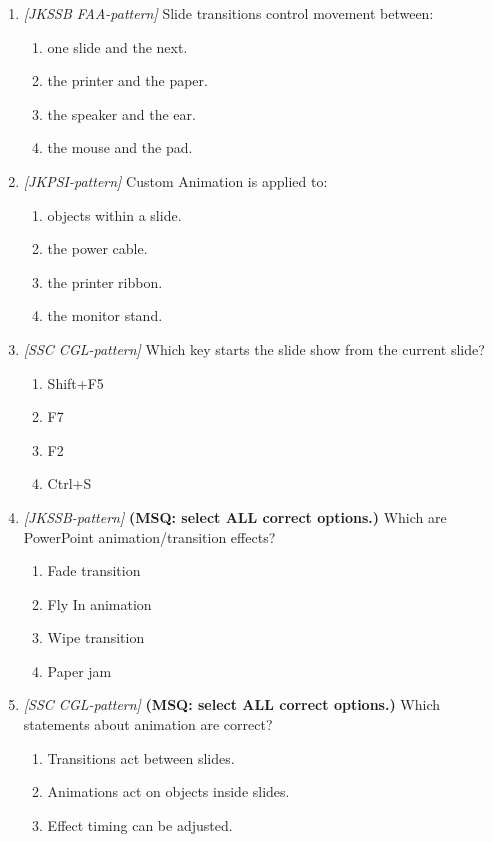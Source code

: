 \begin{enumerate}[label=\textbf{Q\arabic*.}, leftmargin=*]
\item \textit{[JKSSB FAA-pattern]} Slide transitions control movement between:
  \begin{enumerate}[label=\Alph*.]
    \item one slide and the next.
    \item the printer and the paper.
    \item the speaker and the ear.
    \item the mouse and the pad.
  \end{enumerate}
\item \textit{[JKPSI-pattern]} Custom Animation is applied to:
  \begin{enumerate}[label=\Alph*.]
    \item objects within a slide.
    \item the power cable.
    \item the printer ribbon.
    \item the monitor stand.
  \end{enumerate}
\item \textit{[SSC CGL-pattern]} Which key starts the slide show from the current slide?
  \begin{enumerate}[label=\Alph*.]
    \item Shift+F5
    \item F7
    \item F2
    \item Ctrl+S
  \end{enumerate}
\item \textit{[JKSSB-pattern]} \textbf{(MSQ: select ALL correct options.)} Which are PowerPoint animation/transition effects?
  \begin{enumerate}[label=\Alph*.]
    \item Fade transition
    \item Fly In animation
    \item Wipe transition
    \item Paper jam
  \end{enumerate}
\item \textit{[SSC CGL-pattern]} \textbf{(MSQ: select ALL correct options.)} Which statements about animation are correct?
  \begin{enumerate}[label=\Alph*.]
    \item Transitions act between slides.
    \item Animations act on objects inside slides.
    \item Effect timing can be adjusted.

\end{enumerate}
\end{enumerate}
